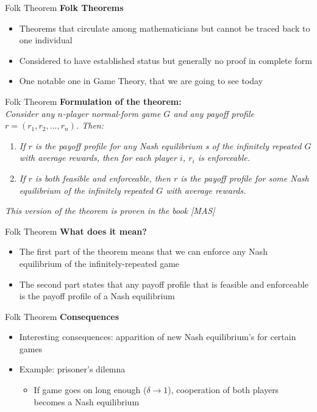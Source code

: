 

\begin{frame}{Folk Theorem}
    \textbf{Folk Theorems}
    \begin{itemize}
        \item Theorems that circulate among mathematicians but cannot be traced back to one individual
        \item Considered to have established status but generally no proof in complete form
        \item One notable one in Game Theory, that we are going to see today
    \end{itemize}
\end{frame}


\begin{frame}{Folk Theorem}
    \textbf{Formulation of the theorem:}\\
    \textit{Consider any $n$-player normal-form game $G$ and any payoff profile $r = (r_1,r_2,...,r_n)$. Then:}
    \begin{enumerate}
        \item \textit{If $r$ is the payoff profile for any Nash equilibrium s of the infinitely repeated $G$ with average rewards, then for each player $i$, $r_i$ is enforceable.}
        \item \textit{If $r$ is both feasible and enforceable, then $r$ is the payoff profile for some Nash equilibrium of the infinitely repeated $G$ with average rewards.}
    \end{enumerate}
    \textit{This version of the theorem is proven in the book [MAS]}
\end{frame}


\begin{frame}{Folk Theorem}
    \textbf{What does it mean?}\\
    \begin{itemize}
        \item The first part of the theorem means that we can enforce any Nash equilibrium of the infinitely-repeated game
        \item The second part states that any payoff profile that is feasible and enforceable is the payoff profile of a Nash equilibrium 
    \end{itemize}
\end{frame}

\begin{frame}{Folk Theorem}
    \textbf{Consequences}\\
    \begin{itemize}
        \item Interesting consequences: apparition of new Nash equilibrium's for certain games
        \item Example: prisoner's dilemna
        \begin{itemize}
            \item If game goes on long enough ($\delta \rightarrow 1$), cooperation of both players becomes a Nash equilibrium
        \end{itemize}
    \end{itemize}
\end{frame}
